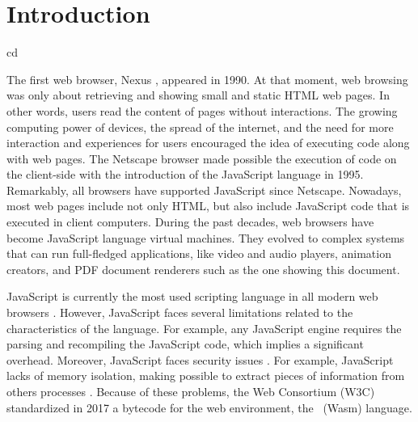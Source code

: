 
\chapter{Introduction}
\label{Intro}

cd 


{
	\color{red}
The first web browser, Nexus \cite{nexus}, appeared in 1990.
At that moment, web browsing was only about retrieving and showing small and static HTML web pages.
In other words, users read the content of pages without interactions.
The growing computing power of devices, the spread of the internet, and the need for more interaction and experiences for users encouraged the idea of executing code along with web pages.
The Netscape browser made possible the execution of code on the client-side with the introduction of the JavaScript \cite{10.1007/978-3-642-14107-2_7} language in 1995.
Remarkably, all browsers have supported JavaScript since Netscape. 
Nowadays, most web pages include not only HTML, but also include JavaScript code that is executed in client computers.
During the past decades, web browsers have become JavaScript language virtual machines. 
They evolved to complex systems that can run full-fledged applications, like video and audio players, animation creators, and PDF document renderers such as the one showing this document.



JavaScript is currently the most used scripting language in all modern web browsers \cite{mulazzani2013fast}. 
However, JavaScript faces several limitations related to the characteristics of the language. For example, any JavaScript engine requires the parsing and recompiling the JavaScript code, which implies a significant overhead.
Moreover, JavaScript faces security issues \cite{10.1145/1190216.1190252}.
For example, JavaScript lacks of memory isolation, making possible to extract pieces of information from others processes \cite{10.1145/3412841.3442001}.
Because of these problems, the Web Consortium (W3C) standardized in 2017 a bytecode for the web environment, the \wasm\ (Wasm) language. 

}

